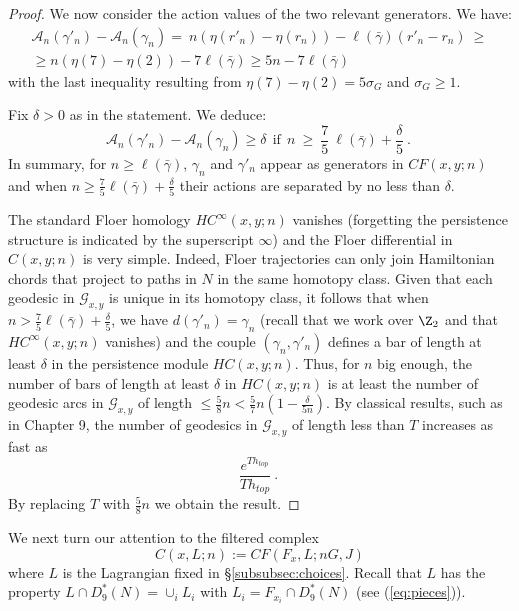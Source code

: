 \begin{proof}
We now consider the action values of the two relevant generators. We have:
\begin{eqnarray*} \mathcal{A}_{n}(\gamma'_{n})-\mathcal{A}_{n}(\gamma_{n}) =\ n(\eta(r'_{n})-\eta(r_{n})) -\ell(\bar{\gamma}) (r'_{n}-r_{n}) \  \geq \\ \geq  n (\eta(7)-\eta(2)) -7\ell(\bar{\gamma})\geq 5n - 7\ell(\bar{\gamma}) 
\end{eqnarray*} with the last inequality resulting from $\eta(7)-\eta(2)= 5\sigma_{G}$ and $\sigma_{G}\geq 1$. 

Fix $\delta>0$ as in the statement. We deduce: 
\begin{equation}
\label{eq:length_bound} 
\mathcal{A}_{n}(\gamma'_{n})-\mathcal{A}_{n}(\gamma_{n}) \geq \delta \ \ 
\mathrm{if}\ \ 
n\  \geq \  \frac{7}{5} \ \ell(\bar{\gamma})+\frac{\delta}{5} ~.~
\end{equation}
In summary, for $n\geq \ell(\bar{\gamma})$,  $\gamma_{n}$
and $\gamma'_{n}$ appear as generators in $CF(x,y;n)$ and when 
$n\geq \frac{7}{5}\ell(\bar{\gamma})+\frac{\delta}{5}$ their actions are separated by no less than $\delta$.  

The standard Floer homology  $HC^{\infty}(x,y; n)$ vanishes
(forgetting the persistence structure is indicated by the superscript $\infty$) and the Floer differential in $C(x,y; n)$ is very simple.
Indeed, Floer trajectories can only join Hamiltonian chords that project to  paths in $N$ in the same homotopy class. Given that each geodesic in $\mathcal{G}_{x,y}$
is unique in its homotopy class, it follows that when $n>\frac{7}{5}\ell(\bar{\gamma})+\frac{\delta}{5}$, we have $d(\gamma'_{n})=\gamma_{n}$ (recall that we work over $\Z_{2}$ and that $HC^{\infty}(x,y;n)$ vanishes) and the 
couple $(\gamma_{n},\gamma'_{n})$ defines a bar of length at least $\delta$ in the
persistence module $HC(x,y;n)$. Thus, for $n$ big enough, the number of bars of length at least $\delta$ in $HC(x,y;n)$ is at least the number of geodesic arcs in $\mathcal{G}_{x,y}$ of length $\leq \frac{5}{8}n < \frac{5}{7} n(1 -\frac{\delta}{5n})$.
By classical results, such as in %
 \cite{Parry_Pollicott:Zeta} Chapter 9, 
the number of geodesics in $\mathcal{G}_{x,y}$ of length less than $T$ increases
as fast as $$\frac{e^{Th_{top}}}{Th_{top}}~.~$$ By replacing $T$ with $\frac{5}{8} n$
we obtain the result.
 \end{proof}

We next turn our attention to the filtered complex  
 $$C(x ,L; n):=CF(F_{x}, L; nG,J)$$
 where $L$
is the Lagrangian fixed in \S\ref{subsubsec:choices}.  Recall that $L$ has the property $L\cap D^{\ast}_{9}(N) =\cup_{i} L_{i}$ with $L_{i}=F_{x_{i}}\cap D^{\ast}_{9}(N)$ (see (\ref{eq:pieces})).
 
